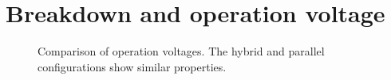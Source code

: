 \section{Breakdown and operation voltage}


\begin{figure}[t]
	\hfill
	\hfill
	\caption[Comparison of operation voltages]{Comparison of operation voltages. The hybrid and parallel configurations show similar properties.}
	\label{fig:ch4:op_fits}
\end{figure}


